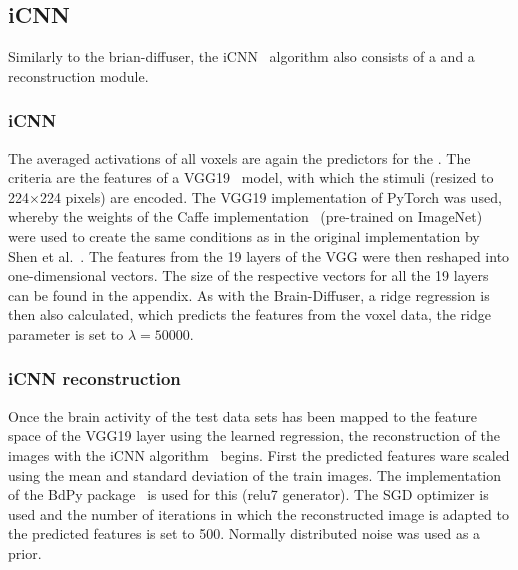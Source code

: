 \subsection{iCNN}
Similarly to the brian-diffuser, the iCNN~\cite{shenDeepImageReconstruction2019} algorithm also consists of a  and a reconstruction module. 
\subsubsection{iCNN }
The averaged activations of all voxels are again the predictors for the . The criteria are the features of a VGG19~\cite{simonyanVeryDeepConvolutional2014} model, with which the stimuli (resized to 224$\times$224 pixels) are encoded. The VGG19 implementation of PyTorch was used, whereby the weights of the Caffe implementation~\cite{ModelZoo} (pre-trained on ImageNet) were used to create the same conditions as in the original implementation by Shen et al.~\cite{shenDeepImageReconstruction2019}. The features from the 19 layers of the VGG were then reshaped into one-dimensional vectors. The size of the respective vectors for all the 19 layers can be found in the appendix. As with the Brain-Diffuser, a ridge regression is then also calculated, which predicts the features from the voxel data, the ridge parameter is set to $\lambda=50000$.

\subsubsection{iCNN reconstruction}
Once the brain activity of the test data sets has been mapped to the feature space of the VGG19 layer using the learned regression, the reconstruction of the images with the iCNN algorithm~\cite{shenDeepImageReconstruction2019} begins. First the predicted features ware scaled using the mean and standard deviation of the train images. The implementation of the BdPy package~\cite{KamitaniLabBdpy2024} is used for this (relu7 generator). The SGD optimizer is used and the number of iterations in which the reconstructed image is adapted to the predicted features is set to 500. Normally distributed noise was used as a prior.


